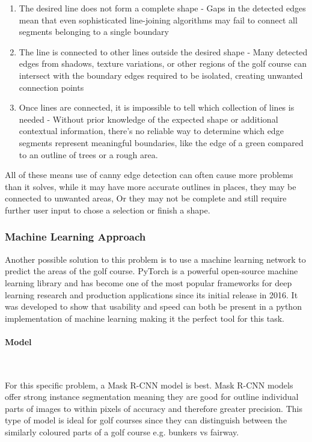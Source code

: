 \documentclass[final]{cmpreport_02}
\begin{document}
\begin{enumerate}
	\item The desired line does not form a complete shape - Gaps in the detected edges mean that even sophisticated line-joining algorithms may fail to connect all segments belonging to a single boundary

	\item The line is connected to other lines outside the desired shape - Many detected edges from shadows, texture variations, or other regions of the golf course can intersect with the boundary edges required to be isolated, creating unwanted connection points

	\item Once lines are connected, it is impossible to tell which collection of lines is needed - Without prior knowledge of the expected shape or additional contextual information, there's no reliable way to determine which edge segments represent meaningful boundaries, like the edge of a green compared to an outline of trees or a rough area.
\end{enumerate}
All of these means use of canny edge detection can often cause more problems than it solves, while it may have more accurate outlines in places, they may be connected to unwanted areas, Or they may not be complete and still require further user input to chose a selection or finish a shape.

\subsubsection{Machine Learning Approach}
Another possible solution to this problem is to use a machine learning network to predict the areas of the golf course.
PyTorch \citep{pytorch} is a powerful open-source machine learning library and has become one of the most popular frameworks for deep learning research and production applications since its initial release in 2016.
It was developed to show that usability and speed can both be present in a python implementation of machine learning making it the perfect tool for this task.

\paragraph{Model} \

For this specific problem, a Mask R-CNN model is best.
Mask R-CNN models offer strong instance segmentation meaning they are good for outline individual parts of images to within pixels of accuracy and therefore greater precision.
This type of model is ideal for golf courses since they can distinguish between the similarly coloured parts of a golf course e.g. bunkers vs fairway.
\end{document}
